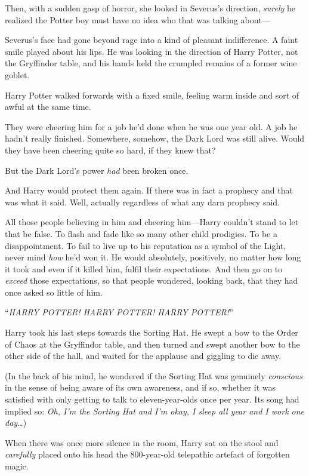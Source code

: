 Then, with a sudden gasp of horror, she looked in Severus’s direction, \emph{surely} he realized the Potter boy must have no idea who that was talking about—

Severus’s face had gone beyond rage into a kind of pleasant indifference. A faint smile played about his lips. He was looking in the direction of Harry Potter, not the Gryffindor table, and his hands held the crumpled remains of a former wine goblet.

\later

Harry Potter walked forwards with a fixed smile, feeling warm inside and sort of awful at the same time.

They were cheering him for a job he’d done when he was one year old. A job he hadn’t really finished. Somewhere, somehow, the Dark Lord was still alive. Would they have been cheering quite so hard, if they knew that?

But the Dark Lord’s power \emph{had} been broken once.

And Harry would protect them again. If there was in fact a prophecy and that was what it said. Well, actually regardless of what any darn prophecy said.

All those people believing in him and cheering him—Harry couldn’t stand to let that be false. To flash and fade like so many other child prodigies. To be a disappointment. To fail to live up to his reputation as a symbol of the Light, never mind \emph{how} he’d won it. He would absolutely, positively, no matter how long it took and even if it killed him, fulfil their expectations. And then go on to \emph{exceed} those expectations, so that people wondered, looking back, that they had once asked so little of him.

“\emph{HARRY POTTER! HARRY POTTER! HARRY POTTER!}”

Harry took his last steps towards the Sorting Hat. He swept a bow to the Order of Chaos at the Gryffindor table, and then turned and swept another bow to the other side of the hall, and waited for the applause and giggling to die away.

(In the back of his mind, he wondered if the Sorting Hat was genuinely \emph{conscious} in the sense of being aware of its own awareness, and if so, whether it was satisfied with only getting to talk to eleven-year-olds once per year. Its song had implied so: \emph{Oh, I’m the Sorting Hat and I’m okay, I sleep all year and I work one day…})

When there was once more silence in the room, Harry sat on the stool and \emph{carefully} placed onto his head the 800-year-old telepathic artefact of forgotten magic.

